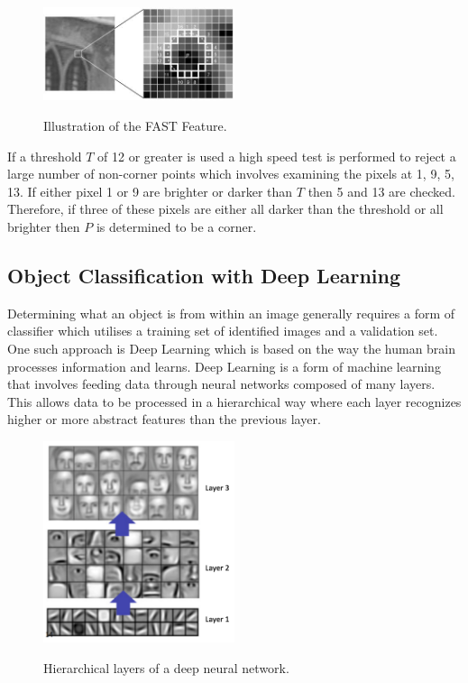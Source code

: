 \documentclass{mproj}
\begin{document}
\begin{figure}[h]
  \caption{Illustration of the FAST Feature.}
  \centering
  \includegraphics[width=0.5\textwidth]{images/fast_speedtest.jpg}
  \label{fig:FAST diagram}
\end{figure}

If a threshold $T$ of 12 or greater is used a high speed test is performed to reject a large number of non-corner points which involves examining the pixels at 1, 9, 5, 13. If either pixel 1 or 9 are brighter or darker than $T$ then 5 and 13 are checked. Therefore, if three of these pixels are either all darker than the threshold or all brighter then $P$ is determined to be a corner. 

\subsection{Object Classification with Deep Learning}

Determining what an object is from within an image generally requires a form of  classifier which utilises a training set of identified images and a validation set. One such approach is Deep Learning which is based on the way the human brain processes information and learns. Deep Learning is a form of machine learning that involves feeding data through neural networks composed of many layers. This allows data to be processed in a hierarchical way where each layer recognizes higher or more abstract features than the previous layer.

\begin{figure}[h]
  \caption{Hierarchical layers of a deep neural network.}
  \centering
  \includegraphics[width=0.5\textwidth]{images/layers.png}
  \label{fig:Deep Net Layers diagram}
\end{figure}
\end{document}
